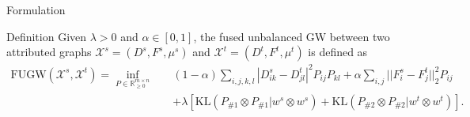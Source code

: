 \documentclass{beamer}
\newcommand{\fugw}{\text{FUGW}}
\newcommand{\kl}{\text{KL}}
\newcommand{\cX}{\mathcal X}
\newcommand{\bbR}{\mathbb R}
\begin{document}
\begin{frame}{Formulation}
\scriptsize
\vspace{-0.7cm}
\begin{block}{Definition}
  Given $\lambda > 0$ and $\alpha \in [0, 1]$, the fused unbalanced GW
  between two attributed graphs $\cX^s = (D^s, F^s, \mu^s)$ and
  $\cX^t = (D^t, F^t, \mu^t)$ is defined as
\begin{align*}
  \fugw(\cX^s, \cX^t) = \inf_{P \in \bbR^{m \times n}_{\geq 0}} \quad
  &(1 - \alpha) \sum_{i,j,k,l} | D^s_{ik} - D^t_{jl}|^2 P_{ij} P_{kl}
  + \alpha \sum_{i,j} || F^s_i - F^t_j||_2^2 P_{ij} \\
  &+ \lambda \left[ \kl(P_{\# 1} \otimes P_{\# 1} \vert w^s \otimes w^s)
  + \kl(P_{\# 2} \otimes P_{\# 2} \vert w^t \otimes w^t) \right].
\end{align*}
\end{block}



\end{frame}
\end{document}
